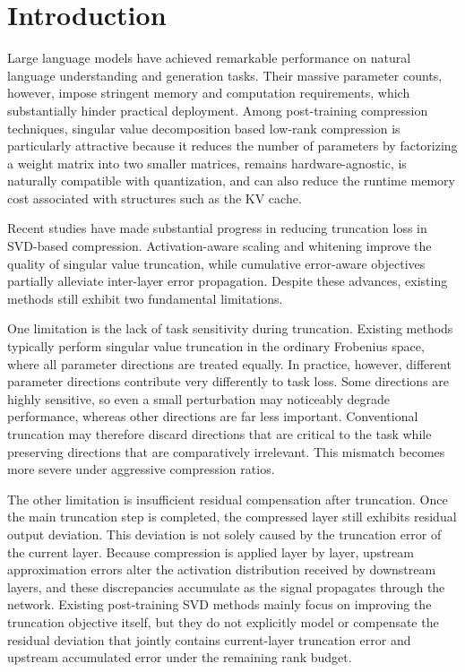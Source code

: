 \documentclass[a4paper,fleqn]{cas-dc}
\begin{document}
\maketitle

\section{Introduction}

Large language models have achieved remarkable performance on natural language understanding and generation tasks. Their massive parameter counts, however, impose stringent memory and computation requirements, which substantially hinder practical deployment. Among post-training compression techniques, singular value decomposition based low-rank compression is particularly attractive because it reduces the number of parameters by factorizing a weight matrix into two smaller matrices, remains hardware-agnostic, is naturally compatible with quantization, and can also reduce the runtime memory cost associated with structures such as the KV cache.

Recent studies have made substantial progress in reducing truncation loss in SVD-based compression. Activation-aware scaling and whitening improve the quality of singular value truncation, while cumulative error-aware objectives partially alleviate inter-layer error propagation. Despite these advances, existing methods still exhibit two fundamental limitations.

One limitation is the lack of task sensitivity during truncation. Existing methods typically perform singular value truncation in the ordinary Frobenius space, where all parameter directions are treated equally. In practice, however, different parameter directions contribute very differently to task loss. Some directions are highly sensitive, so even a small perturbation may noticeably degrade performance, whereas other directions are far less important. Conventional truncation may therefore discard directions that are critical to the task while preserving directions that are comparatively irrelevant. This mismatch becomes more severe under aggressive compression ratios.

The other limitation is insufficient residual compensation after truncation. Once the main truncation step is completed, the compressed layer still exhibits residual output deviation. This deviation is not solely caused by the truncation error of the current layer. Because compression is applied layer by layer, upstream approximation errors alter the activation distribution received by downstream layers, and these discrepancies accumulate as the signal propagates through the network. Existing post-training SVD methods mainly focus on improving the truncation objective itself, but they do not explicitly model or compensate the residual deviation that jointly contains current-layer truncation error and upstream accumulated error under the remaining rank budget.
\end{document}
